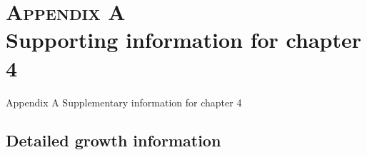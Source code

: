 
\chapter[Appendix A \hspace{0.0025em} Supplementary information for chapter 4]{\textsc{Appendix A} \vspace{8pt} \\ Supporting information for chapter 4}

\label{appendix:A}

\setcounter{page}{1}
\renewcommand{\thepage}{A-\arabic{page}}

\setcounter{chapter}{0}
\renewcommand{\thechapter}{\Alph{chapter}}
\renewcommand{\theHchapter}{A\thechapter}

\setcounter{section}{0}
\renewcommand{\thesection}{A.\arabic{section}}

\setcounter{figure}{0}
\renewcommand{\thefigure}{A.\arabic{figure}}

\setcounter{table}{0}
\renewcommand{\thetable}{A.\arabic{table}}

\updatemylotappendixA

{Appendix A \hspace{0.0025em} Supplementary information for chapter 4}

\regularsection
\headerspecialsectionappendix


\section{Detailed growth information}

